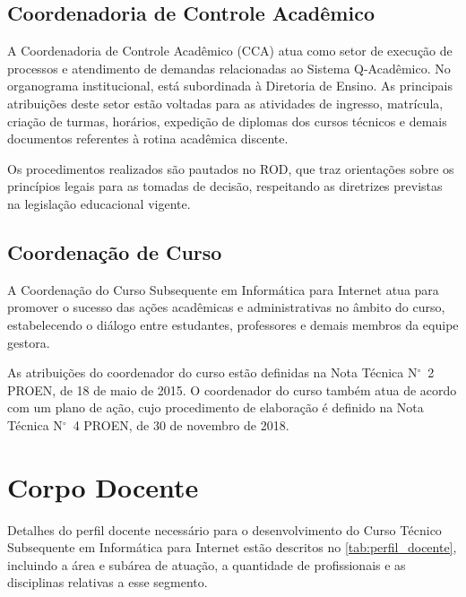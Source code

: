 \documentclass[
	12pt,				%
	openright,			%
	twoside,			%
	a4paper,			%
	chapter=TITLE,		%
	english,			%
	french,				%
	spanish,			%
	brazil,				%
	]{abntex2}
\newcommand{\n}{N$^\circ$}
\begin{document}
\section{Coordenadoria de Controle Acadêmico}
A Coordenadoria de Controle Acadêmico (CCA) atua como setor de execução de processos e atendimento de demandas relacionadas ao Sistema Q-Acadêmico. No organograma institucional, está subordinada à Diretoria de Ensino. As principais atribuições deste setor estão voltadas para as atividades de ingresso, matrícula, criação de turmas, horários, expedição de diplomas dos cursos técnicos e demais documentos referentes à rotina acadêmica discente.

Os procedimentos realizados são pautados no ROD, que traz orientações sobre os princípios legais para as tomadas de decisão, respeitando as diretrizes previstas na legislação educacional vigente.


\section{Coordenação de Curso}

A Coordenação do Curso Subsequente em Informática para Internet atua para promover o sucesso das ações acadêmicas e administrativas no âmbito do curso, estabelecendo o diálogo entre estudantes, professores e demais membros da equipe gestora.

As atribuições do coordenador do curso estão definidas na Nota Técnica \n~2 PROEN, de 18 de maio de 2015. O coordenador do curso também atua de acordo com um plano de ação, cujo procedimento de elaboração é definido na Nota Técnica \n~4 PROEN, de 30 de novembro de 2018.


\chapter{Corpo Docente}


Detalhes do perfil docente necessário para o desenvolvimento do Curso Técnico Subsequente em Informática para Internet  estão descritos no \autoref{tab:perfil_docente},  incluindo a área e subárea de atuação, a quantidade de profissionais e as disciplinas relativas a esse segmento.
\end{document}

